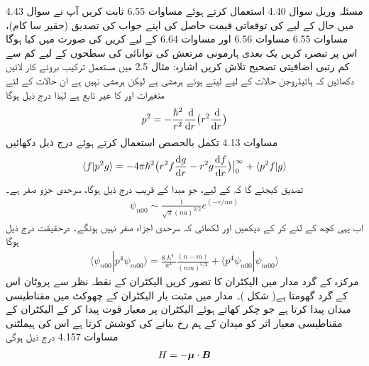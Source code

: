 مسئلہ وریل سوال 4.40 استعمال کرتے ہوئے مساوات 6.55 ثابت کریں 
آپ نے سوال 4.43 میں حال  کے لیے  کی توقعاتی قیمت حاصل کی اپنے جواب کی تصدیق  (حقیر  سا کام)،   مساوات 6.55  مساوات 6.56 اور  مساوات 6.64 کے لیے کریں  کی صورت میں کیا ہوگا اس پر تبصرہ کریں 
 یک بعدی ہارمونی مرتعش کی توانائی کی سطحوں کے لیے کم سے کم رتبی اضافیتی تصحیح تلاش کریں اشارہ: مثال 2.5 میں مستعمل ترکیب بروئے کار لائیں 
دکھائیں کہ ہائیڈروجن حالات کے لیے  لیتے ہوئے  ہرمشی ہے لیکن  ہرمشی نہیں ہے ان حالات کے لئے  متغیرات  اور  کا غیر تابع ہے  لہٰذا   درج ذیل ہوگا 
\begin{align*}
p^2 = - \frac{\hslash^2}{r^2} \frac{\dif }{\dif r} \big ( r^2 \frac{\dif}{\dif r} \big )
\end{align*}
مساوات 4.13 تکمل بالحصص استعمال کرتے ہوئے درج ذیل دکھائیں 
\begin{align*}
\langle f | p^2 g \rangle = - 4 \pi \hslash^2 
\big ( r^2 f \frac{\dif g}{\dif r} - r^2 g \frac{\dif f}{\dif r} \big ) \big \rvert_0^{\infty} + \langle p^2 f | g \rangle 
\end{align*}
تصدیق کیجئے گا کہ  کے لیے، جو مبدا کے قریب درج ذیل ہوگا، سرحدی جزو صفر ہے۔
\begin{align*}
\psi_{n00} \sim \frac{1}{\sqrt{\pi} (na)^{3/2}} e^{(-r/na)}
\end{align*}
اب یہی کچھ  کے لئے کر کے دیکھیں اور لکھائی کہ سرحدی اجزاء صفر نہیں ہونگے۔  درحقیقت درج ذیل ہوگا 
\begin{align*}
\langle \psi_{n00} | p^4 \psi_{m00} \rangle = \frac{8\hslash^4}{a^4} \frac{(n - m)}{(nm)^{5/2}} + \langle p^4 \psi_{n00} | \psi_{m00} \rangle
\end{align*}
مرکزہ کے گرد مدار میں الیکٹران کا تصور کریں الیکٹران کے نقطہ نظر سے پروٹان اس کے گرد گھومتا ہے( شکل )۔   مدار میں مثبت بار الیکٹران کے چھوکٹ میں مقناطیسی میدان  پیدا کرتا ہے جو چکر کھاتے ہوئے الیکٹران پر معیار قوت پیدا کر کے الیکٹران کے مقناطیسی معیار اثر  کو میدان کے ہم رخ بنانے کی کوشش کرتا ہے اس کی ہیملٹنی مساوات 4.157 درج ذیل ہوگی 
\begin{align}
H = - {{\boldsymbol{\mu}}} \cdot {\ensuremath{{\boldsymbol{B}}}}
\end{align}

